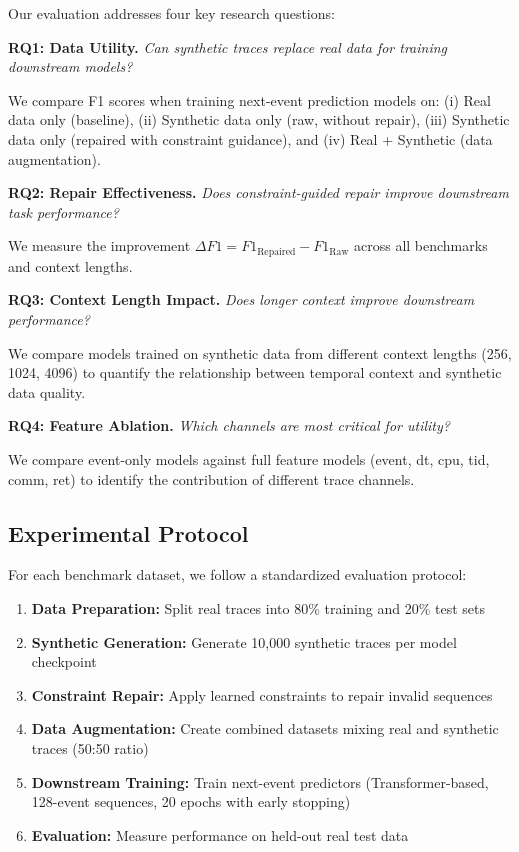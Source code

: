 Our evaluation addresses four key research questions:

\noindent\textbf{RQ1: Data Utility.} \textit{Can synthetic traces replace real data for training downstream models?}

We compare F1 scores when training next-event prediction models on: (i) Real data only (baseline), (ii) Synthetic data only (raw, without repair), (iii) Synthetic data only (repaired with constraint guidance), and (iv) Real + Synthetic (data augmentation).

\noindent\textbf{RQ2: Repair Effectiveness.} \textit{Does constraint-guided repair improve downstream task performance?}

We measure the improvement \(\Delta F1 = F1_{\text{Repaired}} - F1_{\text{Raw}}\) across all benchmarks and context lengths.

\noindent\textbf{RQ3: Context Length Impact.} \textit{Does longer context improve downstream performance?}

We compare models trained on synthetic data from different context lengths (256, 1024, 4096) to quantify the relationship between temporal context and synthetic data quality.

\noindent\textbf{RQ4: Feature Ablation.} \textit{Which channels are most critical for utility?}

We compare event-only models against full feature models (event, dt, cpu, tid, comm, ret) to identify the contribution of different trace channels.

\subsection{Experimental Protocol}
\label{subsec:protocol}

For each benchmark dataset, we follow a standardized evaluation protocol:

\begin{enumerate}
    \item \textbf{Data Preparation:} Split real traces into 80\% training and 20\% test sets
    \item \textbf{Synthetic Generation:} Generate 10,000 synthetic traces per model checkpoint
    \item \textbf{Constraint Repair:} Apply learned constraints to repair invalid sequences
    \item \textbf{Data Augmentation:} Create combined datasets mixing real and synthetic traces (50:50 ratio)
    \item \textbf{Downstream Training:} Train next-event predictors (Transformer-based, 128-event sequences, 20 epochs with early stopping)
    \item \textbf{Evaluation:} Measure performance on held-out real test data
\end{enumerate}

